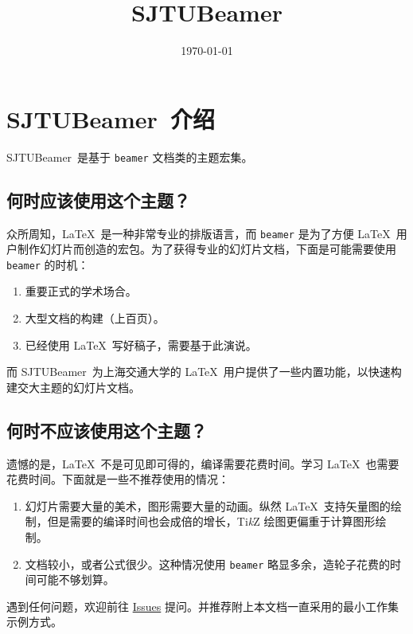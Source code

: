\documentclass[
    UTF8,
    heading=true,
    12pt,
    a4paper
]{ctexrep}
\def\themename{\textsf{SJTUBeamer}}
\begin{document}
    \title{\themename}
    \date{\today}

    \chapter*{\themename\ 介绍}

    \themename\ 是基于 \verb"beamer" 文档类的主题宏集。

    \section*{何时应该使用这个主题？}
    众所周知，\LaTeX\ 是一种非常专业的排版语言，而 \texttt{beamer} 是为了方便 \LaTeX\ 用户制作幻灯片而创造的宏包。为了获得专业的幻灯片文档，下面是可能需要使用 \texttt{beamer} 的时机：
    \begin{enumerate}
        \item 重要正式的学术场合。
        \item 大型文档的构建（上百页）。
        \item 已经使用 \LaTeX\ 写好稿子，需要基于此演说。
    \end{enumerate}

    而 \themename\ 为上海交通大学的 \LaTeX\ 用户提供了一些内置功能，以快速构建交大主题的幻灯片文档。

    \section*{何时不应该使用这个主题？}
    遗憾的是，\LaTeX\ 不是可见即可得的，编译需要花费时间。学习 \LaTeX\ 也需要花费时间。下面就是一些不推荐使用的情况：
    \begin{enumerate}
        \item 幻灯片需要大量的美术，图形需要大量的动画。纵然 \LaTeX\ 支持矢量图的绘制，但是需要的编译时间也会成倍的增长，Ti\emph{k}Z 绘图更偏重于计算图形绘制。
        \item 文档较小，或者公式很少。这种情况使用 \texttt{beamer} 略显多余，造轮子花费的时间可能不够划算。
    \end{enumerate}

    遇到任何问题，欢迎前往 \href{https://github.com/sjtug/SJTUBeamer/issues}{Issues} 提问。并推荐附上本文档一直采用的最小工作集示例方式。

    \setcounter{tocdepth}{0}
    \tableofcontents
\end{document}
